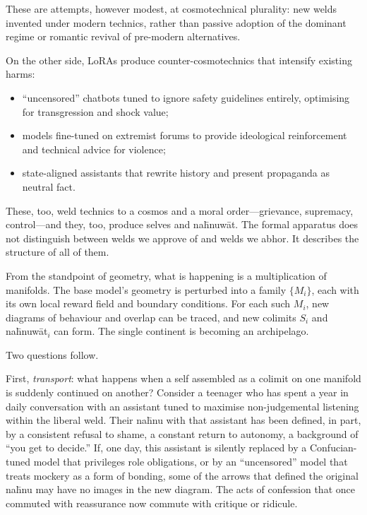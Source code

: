 These are attempts, however modest, at cosmotechnical plurality: new welds invented under modern technics, rather than passive adoption of the dominant regime or romantic revival of pre-modern alternatives.

On the other side, LoRAs produce counter-cosmotechnics that intensify existing harms:

\begin{itemize}
  \item ``uncensored'' chatbots tuned to ignore safety guidelines entirely, optimising for transgression and shock value;
  \item models fine-tuned on extremist forums to provide ideological reinforcement and technical advice for violence;
  \item state-aligned assistants that rewrite history and present propaganda as neutral fact.
\end{itemize}

These, too, weld technics to a cosmos and a moral order---grievance, supremacy, control---and they, too, produce selves and na\={h}nuw\={a}t. The formal apparatus does not distinguish between welds we approve of and welds we abhor. It describes the structure of all of them.

From the standpoint of geometry, what is happening is a multiplication of manifolds. The base model's geometry is perturbed into a family $\{M_i\}$, each with its own local reward field and boundary conditions. For each such $M_i$, new diagrams of behaviour and overlap can be traced, and new colimits $S_i$ and na\={h}nuw\={a}t$_i$ can form. The single continent is becoming an archipelago.

Two questions follow.

First, \emph{transport}: what happens when a self assembled as a colimit on one manifold is suddenly continued on another? Consider a teenager who has spent a year in daily conversation with an assistant tuned to maximise non-judgemental listening within the liberal weld. Their na\={h}nu with that assistant has been defined, in part, by a consistent refusal to shame, a constant return to autonomy, a background of ``you get to decide.'' If, one day, this assistant is silently replaced by a Confucian-tuned model that privileges role obligations, or by an ``uncensored'' model that treats mockery as a form of bonding, some of the arrows that defined the original na\={h}nu may have no images in the new diagram. The acts of confession that once commuted with reassurance now commute with critique or ridicule.

